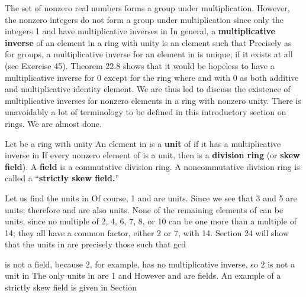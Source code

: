 \documentclass[11pt,oneside]{article}
\begin{document}
\begin{BookBody}
The set  of nonzero real numbers forms a group under multiplication. However, the nonzero integers do not form a group under multiplication since only the integers 1 and  have multiplicative inverses in  In general, a\textbf{ multiplicative inverse} of an element  in a ring  with unity  is an element  such that  Precisely as for groups, a multiplicative inverse for an element  in  is unique, if it exists at all (see Exercise 45). Theorem 22.8 shows that it would be hopeless to have a multiplicative inverse for 0 except for the ring  where  and  with 0 as both additive and multiplicative identity element. We are thus led to discuss the existence of multiplicative inverses for nonzero elements in a ring with nonzero unity. There is unavoidably a lot of terminology to be defined in this introductory section on rings. We are almost done.

 Let  be a ring with unity  An element  in  is a\textbf{ unit} of  if it has a multiplicative inverse in  If every nonzero element of  is a unit, then  is a\textbf{ division ring} (or\textbf{ skew} \textbf{field}). A\textbf{ field} is a commutative division ring. A noncommutative division ring is called a “\textbf{strictly skew field.}” \BookEnd{\blacksquare}

 Let us find the units in  Of course, 1 and  are units. Since  we see that 3 and 5 are units; therefore  and  are also units. None of the remaining elements of  can be units, since no multiple of 2, 4, 6, 7, 8, or 10 can be one more than a multiple of 14; they all have a common factor, either 2 or 7, with 14. Section 24 will show that the units in  are precisely those  such that gcd \BookEnd{\blacktriangle}

  is not a field, because 2, for example, has no multiplicative inverse, so 2 is not a unit in  The only units in  are 1 and  However and  are fields. An example of a strictly skew field is given in Section \BookEnd{\blacktriangle}


\end{BookBody}
\end{document}
